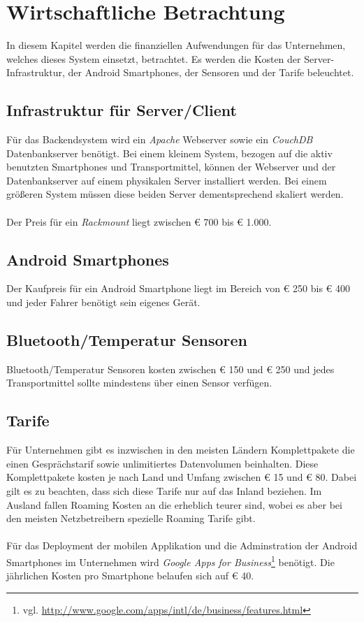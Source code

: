 \section{Wirtschaftliche Betrachtung}
\label{sec:business}

In diesem Kapitel werden die finanziellen Aufwendungen für das Unternehmen, welches dieses System einsetzt, betrachtet.
Es werden die Kosten der Server-Infrastruktur, der Android Smartphones, der Sensoren und der Tarife beleuchtet.

\subsection{Infrastruktur für Server/Client}

Für das Backendsystem wird ein \emph{Apache} Webserver sowie ein \emph{CouchDB} Datenbankserver benötigt.
Bei einem kleinem System, bezogen auf die aktiv benutzten Smartphones und Transportmittel, können der Webserver und der Datenbankserver auf
einem physikalen Server installiert werden. Bei einem größeren System müssen diese beiden Server dementsprechend skaliert werden.
\\ \\
Der Preis für ein \emph{Rackmount} liegt zwischen € 700 bis € 1.000.

\subsection{Android Smartphones}

Der Kaufpreis für ein Android Smartphone liegt im Bereich von € 250 bis € 400 und jeder Fahrer benötigt sein eigenes Gerät.

\subsection{Bluetooth/Temperatur Sensoren}

Bluetooth/Temperatur Sensoren kosten zwischen € 150 und € 250 und jedes Transportmittel sollte mindestens über einen Sensor verfügen.

\subsection{Tarife}

Für Unternehmen gibt es inzwischen in den meisten Ländern Komplettpakete die einen Gesprächstarif sowie unlimitiertes Datenvolumen beinhalten.
Diese Komplettpakete kosten je nach Land und Umfang zwischen € 15 und € 80. Dabei gilt es zu beachten, dass sich diese Tarife nur auf das Inland beziehen.
Im Ausland fallen Roaming Kosten an die erheblich teurer sind, wobei es aber bei den meisten Netzbetreibern spezielle Roaming Tarife gibt.
\\ \\
Für das Deployment der mobilen Applikation und die Adminstration der Android Smartphones im Unternehmen wird 
\emph{Google Apps for Business}\footnote{vgl. \url{http://www.google.com/apps/intl/de/business/features.html}} benötigt.
Die jährlichen Kosten pro Smartphone belaufen sich auf € 40.


